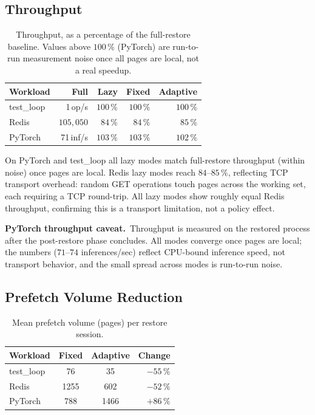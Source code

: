 \documentclass[journal]{IEEEtran}
\begin{document}
\subsection{Throughput}

\begin{table}[t]
\centering
\caption{Throughput, as a percentage of the full-restore baseline. Values
above $100\,\%$ (PyTorch) are run-to-run measurement noise once all pages are
local, not a real speedup.}
\label{tab:throughput}
\renewcommand{\arraystretch}{1.15}
\small
\begin{tabular}{l r r r r}
\toprule
Workload & Full & Lazy & Fixed & Adaptive \\
\midrule
test\_loop & 1\,op/s   & $100\,\%$ & $100\,\%$ & $100\,\%$ \\
Redis      & $105{,}050$ & $84\,\%$  & $84\,\%$  & $85\,\%$  \\
PyTorch    & 71\,inf/s & $103\,\%$ & $103\,\%$  & $102\,\%$  \\
\bottomrule
\end{tabular}
\end{table}

On PyTorch and test\_loop all lazy modes match full-restore throughput
(within noise) once pages are local. Redis lazy modes reach
$84$--$85\,\%$, reflecting TCP transport overhead: random GET operations
touch pages across the working set, each requiring a TCP round-trip. All
lazy modes show roughly equal Redis throughput, confirming this is a
transport limitation, not a policy effect.

\textbf{PyTorch throughput caveat.}\, Throughput is measured on the
restored process after the post-restore phase concludes. All modes
converge once pages are local; the numbers ($71$--$74$ inferences/sec)
reflect CPU-bound inference speed, not transport behavior, and the small
spread across modes is run-to-run noise.

\subsection{Prefetch Volume Reduction}
\label{sec:prefvol}

\begin{table}[t]
\centering
\caption{Mean prefetch volume (pages) per restore session.}
\label{tab:prefetch}
\renewcommand{\arraystretch}{1.15}
\small
\begin{tabular}{l S[table-format=4.0] S[table-format=4.0] r}
\toprule
{Workload} & {Fixed} & {Adaptive} & {Change} \\
\midrule
test\_loop & 76    & 35    & $-55\,\%$ \\
Redis      & 1255  & 602   & $-52\,\%$ \\
PyTorch    & 788   & 1466  & $+86\,\%$ \\
\bottomrule
\end{tabular}
\end{table}
\end{document}
